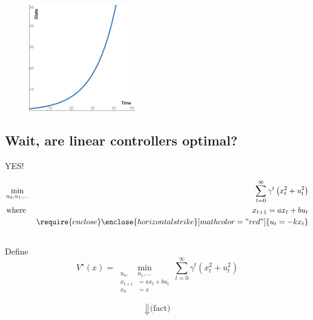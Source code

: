 \documentclass[
  letterpaper,
  DIV=11,
  numbers=noendperiod,
  oneside]{scrartcl}
\begin{document}
\begin{figure}
%
\begin{minipage}{0.33\linewidth}
\includegraphics[width=\textwidth,height=1.82292in]{figs/desmos-unstable.png}\end{minipage}%

\end{figure}%


\subsection{Wait, are linear controllers
optimal?}\label{wait-are-linear-controllers-optimal}

YES!

\begin{align}
\min_{u_0, u_1, \ldots} && \sum_{t=0}^{\infty} \gamma^t \left( x_t^2 +  u_t^2 \right)\\
\text{where } && x_{t+1} = a x_t + b u_t \\
&& \require{enclose}\enclose{horizontalstrike}[mathcolor="red"]{\color{black}{u_t = -k x_t}}
\end{align}

\subsection{}\label{section-17}

Define
\[V^{\star}(x) = \min_{\begin{align} u_0, & u_1, \ldots \\ x_{t+1} &= a x_t + b u_t \\ x_0 &= x \end{align}} \sum_{t=0}^{\infty} \gamma^t \left( x_t^2 +  u_t^2 \right)\]

\[\Downarrow \text{(fact)}\]
\end{document}
